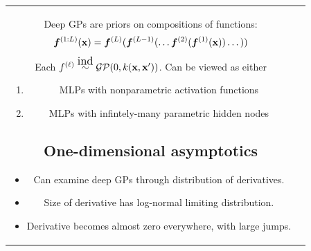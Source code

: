 \documentclass[portrait,a0b,final,a4resizeable]{include/a0poster}
\begin{document}
\begin{poster}
\begin{multicols}{2}
\vspace{0.5in} 

\begin{tabular}{cc}
\begin{minipage}[c]{0.7\columnwidth}

Deep GPs are priors on compositions of functions:
\begin{align*}
\boldsymbol{f}^{(1:L)}(\mathbf{x}) = \boldsymbol{f}^{(L)}(\boldsymbol{f}^{(L-1)}(\dots \boldsymbol{f}^{(2)}(\boldsymbol{f}^{(1)}(\mathbf{x})) \dots))
\end{align*}
%
Each $f^{(\ell)} \simind \GPt{0}{k(\vx, \vx')}$. 
Can be viewed as either
\begin{enumerate}
	\item  MLPs with nonparametric activation functions
    \item  MLPs with infintely-many parametric hidden nodes
\end{enumerate}




\subsection*{One-dimensional asymptotics}

\begin{itemize}
\item Can examine deep GPs through distribution of derivatives.
\item Size of derivative has log-normal limiting distribution.
\item Derivative becomes almost zero everywhere, with large jumps.
\end{itemize}

\end{minipage}
&

\newcommand{\onedsamplepic}[1]{
\hspace{-0.2in}
\texttt{[image: ../figures/1d\_samples/latent\_seed\_0\_1d\_large/layer-\#1]}} 
\newcommand{\onedsamplepiccon}[1]{
\hspace{-0.2in}
\texttt{[image: ../figures/1d\_samples/latent\_seed\_0\_1d\_large\_connected/layer-\#1]}} 





\end{tabular}
\end{multicols}
\end{poster}
\end{document}
